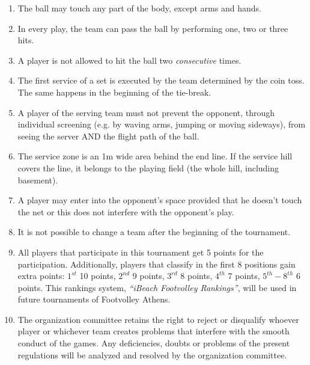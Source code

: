 \documentclass[a4paper,11pt]{article}
\begin{document}
\begin{enumerate}
\item The ball may touch any part of the body, except arms and hands.

\item In every play, the team can pass the ball by performing one, two or three
  hits.

\item A player is not allowed to hit the ball two \textit{consecutive} times.

\item The first service of a set is executed by the team determined by the coin
  toss. The same happens in the beginning of the tie-break.

\item A player of the serving team must not prevent the opponent, through
  individual screening (e.g. by waving arms, jumping or moving sideways), from
  seeing the server AND the flight path of the ball.

\item The service zone is an 1m wide area behind the end line. If the service
  hill covers the line, it belongs to the playing field (the whole hill,
  including basement).

\item A player may enter into the opponent’s space provided that he doesn't
  touch the net or this does not interfere with the opponent’s play.

\item It is not possible to change a team after the beginning of the tournament.

\item All players that participate in this tournament get 5 points for the
  participation. Additionally, players that classify in the first 8 positions
  gain extra points: $1^{st}$ 10 points, $2^{nd}$ 9 points, $3^{rd}$ 8 points,
  $4^{th}$ 7 points, $5^{th}-8^{th}$ 6 points. This rankings system,
  \textit{``iBeach Footvolley Rankings''}, will be used in future tournaments of
  Footvolley Athens.

\item The organization committee retains the right to reject or disqualify
  whoever player or whichever team creates problems that interfere with the
  smooth conduct of the games. Any deficiencies, doubts or problems of the
  present regulations will be analyzed and resolved by the organization
  committee.

\end{enumerate}
\end{document}
